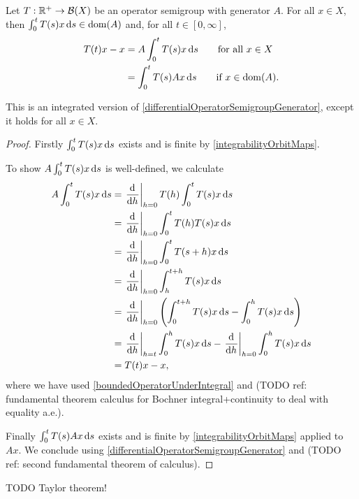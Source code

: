 \begin{proposition} \label{integralOperatorSemigroupGenerator}
Let $T: \mathbb{R}^+\to \operatorname{\mathcal{B}}(X)$ be an operator semigroup with generator $A$. For all $x\in X$, then $\int_0^t T(s)x\operatorname{d \!}{s}\in\operatorname{dom}(A)$ and, for all $t\in [0,\infty]$,
\begin{align*}
T(t)x - x &= A\int_0^t T(s)x\operatorname{d \!}{s} \qquad\text{for all $x\in X$} \\
&= \int_0^t T(s)Ax\operatorname{d \!}{s} \qquad\text{if $x\in\operatorname{dom}(A)$}.
\end{align*}
\end{proposition}
This is an integrated version of \ref{differentialOperatorSemigroupGenerator}, except it holds for all $x\in X$.
\begin{proof}
Firstly $\int_0^t T(s)x\operatorname{d \!}{s}$ exists and is finite by \ref{integrabilityOrbitMaps}.

To show $A\int_0^t T(s)x\operatorname{d \!}{s}$ is well-defined, we calculate
\begin{align*}
A\int_0^t T(s)x\diff{s} &= \left.\dod{}{h}\right|_{h=0}T(h)\int_0^t T(s)x\diff{s} \\
&= \left.\dod{}{h}\right|_{h=0}\int_0^t T(h)T(s)x\diff{s} \\
&= \left.\dod{}{h}\right|_{h=0}\int_0^t T(s+h)x\diff{s} \\
&= \left.\dod{}{h}\right|_{h=0}\int_h^{t+h} T(s)x\diff{s} \\
&= \left.\dod{}{h}\right|_{h=0}\left(\int_0^{t+h} T(s)x\diff{s}-\int_0^{h} T(s)x\diff{s}\right) \\
&= \left.\dod{}{h}\right|_{h=t}\int_0^{h} T(s)x\diff{s}-\left.\dod{}{h}\right|_{h=0}\int_0^{h} T(s)x\diff{s} \\
&= T(t)x - x,
\end{align*}
where we have used \ref{boundedOperatorUnderIntegral} and (TODO ref: fundamental theorem calculus for Bochner integral+continuity to deal with equality a.e.).

Finally $\int_0^t T(s)Ax\operatorname{d \!}{s}$ exists and is finite by \ref{integrabilityOrbitMaps} applied to $Ax$. We conclude using \ref{differentialOperatorSemigroupGenerator} and (TODO ref: second fundamental theorem of calculus).
\end{proof}

TODO Taylor theorem!

